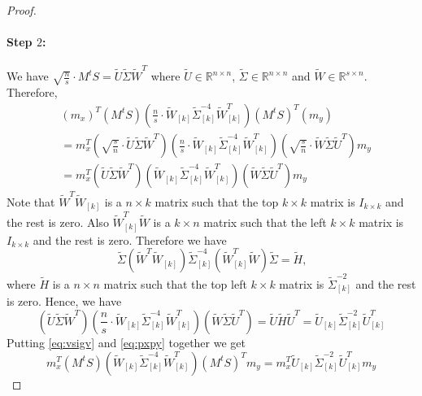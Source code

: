 \documentclass[letterpaper,11pt]{article}
\newcommand{\R}{\mathbb{R}}
\theoremstyle{plain}
\theoremstyle{definition}
\theoremstyle{remark}
\begin{document}
\begin{proof}
\paragraph{Step $2$:} We have $\sqrt{\frac{n}{s}} \cdot M^tS=\widetilde{U}\widetilde{\Sigma}\widetilde{W}^T$ where $\widetilde{U}\in \R^{n\times n}$, $\widetilde{\Sigma}\in \R^{n\times n}$ and $\widetilde{W}\in \R^{s\times n}$. Therefore, 
\begin{align}
\label{eq:pxpy}
 &(m_x)^T  (M^tS)\left(\frac{n}{s}\cdot\widetilde{W}_{[k]} \widetilde{\Sigma}^{-4}_{[k]} \widetilde{W}^T_{[k]}\right) (M^tS)^T (m_{y}) \nonumber\\
 &= m_x^T  \left(\sqrt{\frac{s}{n}}\cdot \widetilde{U}\widetilde{\Sigma}\widetilde{W}^T\right)\left(\frac{n}{s}\cdot\widetilde{W}_{[k]} \widetilde{\Sigma}^{-4}_{[k]} \widetilde{W}^T_{[k]}\right) \left(\sqrt{\frac{s}{n}}\cdot\widetilde{W}\widetilde{\Sigma}\widetilde{U}^T\right) m_y \nonumber\\
 &= m_x^T  \left( \widetilde{U}\widetilde{\Sigma}\widetilde{W}^T\right)\left(\widetilde{W}_{[k]} \widetilde{\Sigma}^{-4}_{[k]} \widetilde{W}^T_{[k]}\right) \left(\widetilde{W}\widetilde{\Sigma}\widetilde{U}^T\right) m_y
\end{align}
Note that $\widetilde{W}^T\widetilde{W}_{[k]}$ is a $n\times k$ matrix such that the top $k\times k$ matrix is $I_{k\times k}$ and the rest is zero. Also $\widetilde{W}_{[k]}^T\widetilde{W}$ is a $k\times n$ matrix such that the left $k\times k$ matrix is $I_{k\times k}$ and the rest is zero. Therefore we have 
\[\widetilde{\Sigma}\left(\widetilde{W}^T\widetilde{W}_{[k]}\right) \widetilde{\Sigma}^{-4}_{[k]} \left(\widetilde{W}^T_{[k]} \widetilde{W}\right)\widetilde{\Sigma} = \widetilde{H} \text{,}\]
where $\widetilde{H}$ is a $n\times n$ matrix such that the top left $k\times k$ matrix is $\widetilde{\Sigma}^{-2}_{[k]}$ and the rest is zero. Hence, we have
\begin{equation}
\label{eq:vsigv}
(\widetilde{U}\widetilde{\Sigma}\widetilde{W}^T)\left(\frac{n}{s}\cdot\widetilde{W}_{[k]} \widetilde{\Sigma}^{-4}_{[k]} \widetilde{W}^T_{[k]}\right) (\widetilde{W}\widetilde{\Sigma}\widetilde{U}^T) = \widetilde{U}\widetilde{H}\widetilde{U}^T = \widetilde{U}_{[k]}\widetilde{\Sigma}^{-2}_{[k]} \widetilde{U}_{[k]}^T
\end{equation}
Putting \eqref{eq:vsigv} and \eqref{eq:pxpy} together we get
\begin{equation}
\label{eq:vtild}
 m_x^T  (M^tS)(\widetilde{W}_{[k]} \widetilde{\Sigma}^{-4}_{[k]} \widetilde{W}^T_{[k]}) (M^tS)^T m_y = m_x^T  \widetilde{U}_{[k]}\widetilde{\Sigma}^{-2}_{[k]} \widetilde{U}_{[k]}^T m_y
\end{equation}

\end{proof}
\end{document}
